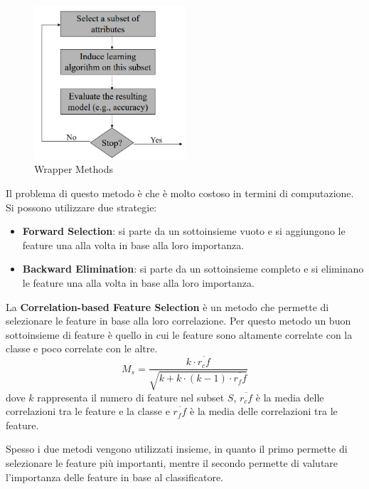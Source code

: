 \begin{itemize}
            \begin{figure}[!ht]
                  \centering
                  \includegraphics[width=0.5\textwidth]{./img/Preprocessing/wrapper.png}
                  \caption{Wrapper Methods}
                  \label{fig:wrapper}
            \end{figure}

            Il problema di questo metodo è che è molto costoso in termini di
            computazione. Si possono utilizzare due strategie:
            \begin{itemize}
                  \item \textbf{Forward Selection}: si parte da un sottoinsieme
                        vuoto e si aggiungono le feature una alla volta in base
                        alla loro importanza.
                  \item \textbf{Backward Elimination}: si parte da un sottoinsieme
                        completo e si eliminano le feature una alla volta in base
                        alla loro importanza.
            \end{itemize}
\end{itemize}

La \textbf{Correlation-based Feature Selection} è un metodo che permette di
selezionare le feature in base alla loro correlazione. Per questo metodo un
buon sottoinsieme di feature è quello in cui le feature sono altamente correlate
con la classe e poco correlate con le altre.
\begin{equation}
      M_s = \frac{k \cdot \overline{r_cf}}{\sqrt{k + k \cdot (k - 1) \cdot \overline{r_ff}}}
\end{equation}
dove $k$ rappresenta il numero di feature nel subset $S$, $\overline{r_cf}$ è la
media delle correlazioni tra le feature e la classe e $\overline{r_ff}$ è la media
delle correlazioni tra le feature.

Spesso i due metodi vengono utilizzati insieme, in quanto il primo permette di
selezionare le feature più importanti, mentre il secondo permette di valutare
l'importanza delle feature in base al classificatore.